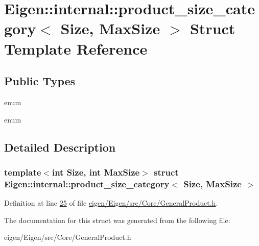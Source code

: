 \hypertarget{struct_eigen_1_1internal_1_1product__size__category}{}\section{Eigen\+:\+:internal\+:\+:product\+\_\+size\+\_\+category$<$ Size, Max\+Size $>$ Struct Template Reference}
\label{struct_eigen_1_1internal_1_1product__size__category}
\subsection*{Public Types}
\begin{DoxyCompactItemize}
\item 
\mbox{\label{struct_eigen_1_1internal_1_1product__size__category_a2dcf14d6cafd97f9a83bfef521cb745d}} 
enum 
\item 
\mbox{\label{struct_eigen_1_1internal_1_1product__size__category_a6f161aea9529e33ddbcf48dc2be596b3}} 
enum 
\end{DoxyCompactItemize}


\subsection{Detailed Description}
\subsubsection*{template$<$int Size, int Max\+Size$>$\newline
struct Eigen\+::internal\+::product\+\_\+size\+\_\+category$<$ Size, Max\+Size $>$}



Definition at line \hyperlink{eigen_2_eigen_2src_2_core_2_general_product_8h_source_l00025}{25} of file \hyperlink{eigen_2_eigen_2src_2_core_2_general_product_8h_source}{eigen/\+Eigen/src/\+Core/\+General\+Product.\+h}.



The documentation for this struct was generated from the following file\+:\begin{DoxyCompactItemize}
\item 
eigen/\+Eigen/src/\+Core/\+General\+Product.\+h\end{DoxyCompactItemize}
